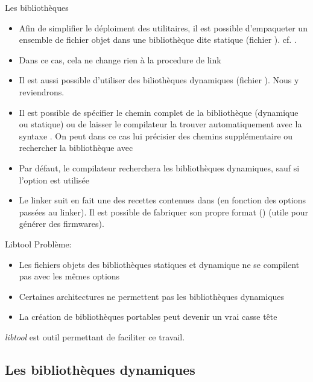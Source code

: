 \begin{frame}[fragile=singleslide]{Les bibliothèques}
  \begin{itemize}
  \item  Afin de  simplifier  le déploiment  des  utilitaires, il  est
    possible  d'empaqueter  un  ensemble  de fichier  objet  dans  une
    bibliothèque dite statique (fichier ). cf. .
  \item Dans ce cas, cela ne change rien à la procedure de link
  \item Il  est aussi possible d'utiliser  des biliothèques dynamiques
    (fichier ). Nous y reviendrons.
  \item  Il  est  possible  de  spécifier  le  chemin  complet  de  la
    bibliothèque (dynamique ou statique)  ou de laisser le compilateur
    la trouver  automatiquement avec  la syntaxe .  On peut
    dans ce cas lui précisier des chemins supplémentaire ou rechercher
    la bibliothèque avec 
  \item  Par  défaut,  le  compilateur  recherchera  les  bibliothèques
    dynamiques, sauf si l'option  est utilisée
  \item  Le  linker suit  en  fait  une  des recettes  contenues  dans
      (en fonction  des  options passées  au
    linker).   Il   est  possible  de  fabriquer   son  propre  format
    () (utile pour générer des firmwares).
  \end{itemize}
\end{frame}

\begin{frame}[fragile=singleslide]{Libtool}
  Problème:
  \begin{itemize}
  \item Les  fichiers objets des bibliothèques  statiques et dynamique
    ne se compilent pas avec les mêmes options
  \item  Certaines architectures ne  permettent pas  les bibliothèques
    dynamiques
  \item La  création de bibliothèques  portables peut devenir  un vrai
    casse tête
  \end{itemize}
  \emph{libtool} est outil permettant de faciliter ce travail.
\end{frame}

\subsection{Les bibliothèques dynamiques}

